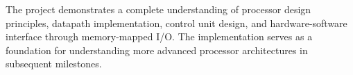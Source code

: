 The project demonstrates a complete understanding of processor design principles, datapath implementation, control unit design, and hardware-software interface through memory-mapped I/O. The implementation serves as a foundation for understanding more advanced processor architectures in subsequent milestones.

